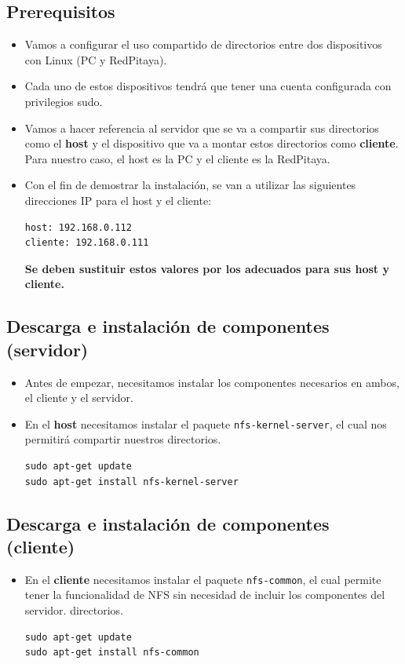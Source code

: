 \documentclass[a4paper,11pt]{article}
\begin{document}
\subsection{Prerequisitos}
\begin{itemize}
  \item Vamos a configurar el uso compartido de directorios entre dos
        dispositivos con Linux (PC y RedPitaya).
  \item Cada uno de estos dispositivos tendrá que tener una cuenta
        configurada con privilegios sudo.
  \item Vamos a hacer referencia al servidor que se va a compartir sus
        directorios como el \textbf{host} y el dispositivo que va a montar estos
        directorios como \textbf{cliente}. Para nuestro caso, el host es la PC y
        el cliente es la RedPitaya.
  \item Con el fin de demostrar la instalación, se van a utilizar las
        siguientes direcciones IP para el host y el cliente:
\begin{verbatim}
host: 192.168.0.112 
cliente: 192.168.0.111
\end{verbatim}
        \textbf{Se deben sustituir estos valores por los adecuados para sus
        host y cliente.}
\end{itemize}

\subsection{Descarga e instalación de componentes (servidor)}
\begin{itemize}
\item Antes de empezar, necesitamos instalar los componentes necesarios en
      ambos, el cliente y el servidor.
\item En el \textbf{host} necesitamos instalar el paquete
\texttt{nfs-kernel-server}, el cual nos permitirá compartir nuestros
directorios.
\begin{verbatim}
sudo apt-get update
sudo apt-get install nfs-kernel-server
\end{verbatim}
\end{itemize}

\subsection{Descarga e instalación de componentes (cliente)}
\begin{itemize}
\item En el \textbf{cliente} necesitamos instalar el paquete
            \texttt{nfs-common}, el cual permite tener la funcionalidad de NFS
            sin necesidad de incluir los componentes del servidor.
            directorios.
\begin{verbatim}
sudo apt-get update
sudo apt-get install nfs-common

\end{verbatim}
\end{itemize}
\end{document}
